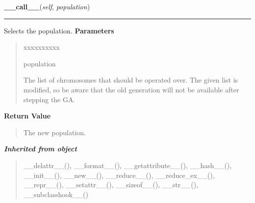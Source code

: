     \vspace{0.5ex}

\hspace{.8\funcindent}\begin{boxedminipage}{\funcwidth}

    \raggedright \textbf{\_\_call\_\_}(\textit{self}, \textit{population})

    \vspace{-1.5ex}

    \rule{\textwidth}{0.5\fboxrule}
\setlength{\parskip}{2ex}

Selects the population.
\setlength{\parskip}{1ex}
      \textbf{Parameters}
      \vspace{-1ex}

      \begin{quote}
        \begin{Ventry}{xxxxxxxxxx}

          \item[population]


The list of chromosomes that should be operated over. The given list
is modified, so be aware that the old generation will not be
available after stepping the GA.
        \end{Ventry}

      \end{quote}

      \textbf{Return Value}
    \vspace{-1ex}

      \begin{quote}

The new population.
      \end{quote}

    \end{boxedminipage}


\large{\textbf{\textit{Inherited from object}}}

\begin{quote}
\_\_delattr\_\_(), \_\_format\_\_(), \_\_getattribute\_\_(), \_\_hash\_\_(), \_\_init\_\_(), \_\_new\_\_(), \_\_reduce\_\_(), \_\_reduce\_ex\_\_(), \_\_repr\_\_(), \_\_setattr\_\_(), \_\_sizeof\_\_(), \_\_str\_\_(), \_\_subclasshook\_\_()
\end{quote}


